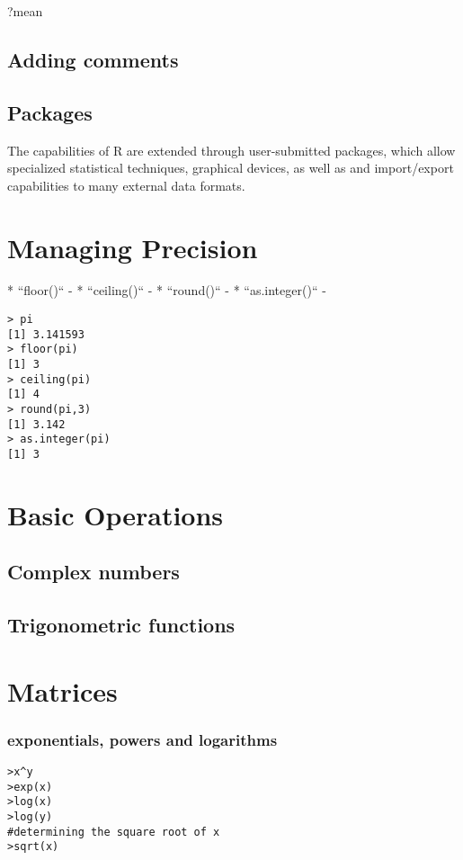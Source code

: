 \begin{itemize}
?mean

\subsection{Adding comments}

\subsection{Packages}
The capabilities of R are extended through user-submitted packages, which allow specialized statistical techniques, graphical devices, as well as and
import/export capabilities to many external data formats.

\section{Managing Precision}
\begin{itemize}
*  ``floor()`` - 
*  ``ceiling()`` - 
*  ``round()`` - 
*  ``as.integer()`` -
\end{itemize}

\begin{framed}
\begin{verbatim}
> pi
[1] 3.141593
> floor(pi)
[1] 3
> ceiling(pi)
[1] 4
> round(pi,3)
[1] 3.142
> as.integer(pi)
[1] 3
\end{verbatim}
\end{framed}

\section{Basic Operations}
\subsection{Complex numbers}
\subsection{Trigonometric functions}
\section{Matrices}

%


\subsubsection{exponentials, powers and logarithms}
\begin{framed}
\begin{verbatim}
>x^y
>exp(x)
>log(x)
>log(y)
#determining the square root of x
>sqrt(x)
\end{verbatim}
\end{framed}


\end{itemize}
